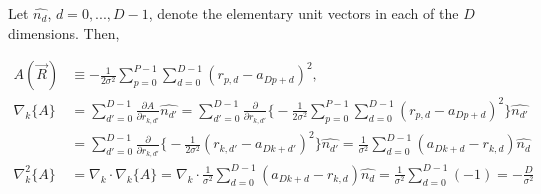 \documentclass[12pt]{article}
\begin{document}
\noindent Let $\hat{n_d}$, $d = 0, ..., D-1$, denote the elementary unit vectors in each of the $D$ dimensions. Then,

\begin{align*}
A(\vec{R}) &\equiv -\frac{1}{2\sigma^2} \sum_{p=0}^{P-1}\sum_{d=0}^{D-1} (r_{p,d} - a_{Dp+d})^2,\\
\nabla_k \{A\}
&= \sum_{d'=0}^{D-1} \frac{\partial A}{\partial r_{k,d'}} \hat{n_{d'}} = \sum_{d'=0}^{D-1} \frac{\partial}{\partial r_{k,d'}} \bigg\{ -\frac{1}{2\sigma^2} \sum_{p=0}^{P-1}\sum_{d=0}^{D-1} (r_{p,d} - a_{Dp+d})^2 \bigg\} \hat{n_{d'}} \\
&= \sum_{d'=0}^{D-1} \frac{\partial}{\partial r_{k,d'}} \bigg\{ -\frac{1}{2\sigma^2}  (r_{k,d'} - a_{Dk+d'})^2 \bigg\} \hat{n_{d'}} = \frac{1}{\sigma^2} \sum_{d=0}^{D-1} (a_{Dk+d} -r_{k,d} ) \hat{n_{d}}  \\
\nabla_k^2 \{A\} &= \nabla_k \cdot \nabla_k\{A\} = \nabla_k \cdot \frac{1}{\sigma^2} \sum_{d=0}^{D-1} (a_{Dk+d} -r_{k,d} ) \hat{n_{d}} = \frac{1}{\sigma^2} \sum_{d=0}^{D-1} (-1) = -\frac{D}{\sigma^2}\\ 
\end{align*}
\end{document}
